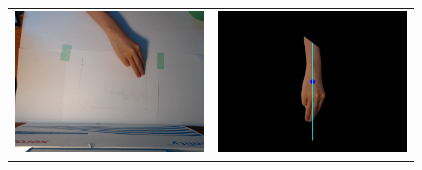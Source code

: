 \begin{tabular}{ll}
\includegraphics[width=5cm]{fig7/4-b.png} &
\includegraphics[width=5cm]{fig7/4-a.png} \\
\end{tabular}
